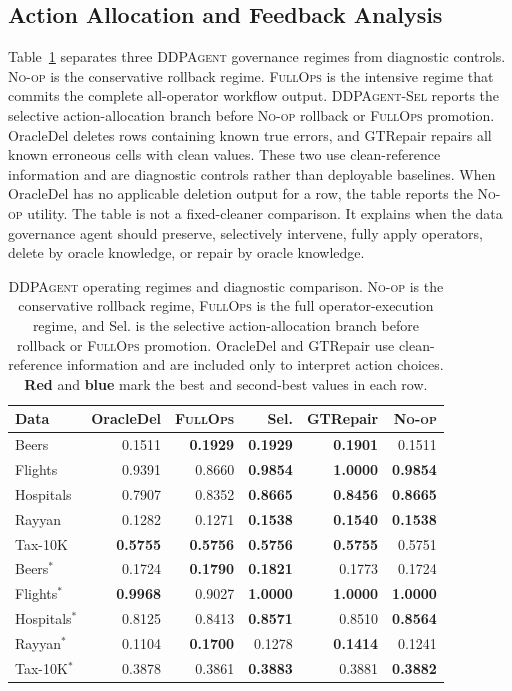 \documentclass[sigconf, nonacm]{acmart}
\newcommand{\sys}{\textsc{DDPAgent}\xspace}
\newcommand{\noop}{\textsc{No-op}\xspace}
\newcommand{\fullops}{\textsc{FullOps}\xspace}
\newcommand{\syssel}{\textsc{DDPAgent-Sel}\xspace}
\newcommand{\best}[1]{\textcolor{rankFirst}{\textbf{#1}}}
\newcommand{\runner}[1]{\textcolor{rankSecond}{\textbf{#1}}}
\begin{document}
\subsection{Action Allocation and Feedback Analysis}

Table~\ref{tab:ablation} separates three \sys governance regimes from diagnostic controls. \noop is the conservative rollback regime. \fullops is the intensive regime that commits the complete all-operator workflow output. \syssel reports the selective action-allocation branch before \noop rollback or \fullops promotion. OracleDel deletes rows containing known true errors, and GTRepair repairs all known erroneous cells with clean values. These two use clean-reference information and are diagnostic controls rather than deployable baselines. When OracleDel has no applicable deletion output for a row, the table reports the \noop utility. The table is not a fixed-cleaner comparison. It explains when the data governance agent should preserve, selectively intervene, fully apply operators, delete by oracle knowledge, or repair by oracle knowledge.

\begin{table}[t]
  \caption{\sys operating regimes and diagnostic comparison. \noop is the conservative rollback regime, \fullops is the full operator-execution regime, and Sel. is the selective action-allocation branch before rollback or \fullops promotion. OracleDel and GTRepair use clean-reference information and are included only to interpret action choices. \best{Red} and \runner{blue} mark the best and second-best values in each row.}
  \label{tab:ablation}
  \centering
  \small
  \begin{tabular}{@{}lrrrrr@{}}
    \toprule
    Data & OracleDel & \fullops & Sel. & GTRepair & \noop \\
    \midrule
    Beers & 0.1511 & \best{0.1929} & \best{0.1929} & \runner{0.1901} & 0.1511 \\
    Flights & 0.9391 & 0.8660 & \runner{0.9854} & \best{1.0000} & \runner{0.9854} \\
    Hospitals & 0.7907 & 0.8352 & \best{0.8665} & \runner{0.8456} & \best{0.8665} \\
    Rayyan & 0.1282 & 0.1271 & \runner{0.1538} & \best{0.1540} & \runner{0.1538} \\
    Tax-10K & \runner{0.5755} & \best{0.5756} & \best{0.5756} & \runner{0.5755} & 0.5751 \\
    Beers$^*$ & 0.1724 & \runner{0.1790} & \best{0.1821} & 0.1773 & 0.1724 \\
    Flights$^*$ & \runner{0.9968} & 0.9027 & \best{1.0000} & \best{1.0000} & \best{1.0000} \\
    Hospitals$^*$ & 0.8125 & 0.8413 & \best{0.8571} & 0.8510 & \runner{0.8564} \\
    Rayyan$^*$ & 0.1104 & \best{0.1700} & 0.1278 & \runner{0.1414} & 0.1241 \\
    Tax-10K$^*$ & 0.3878 & 0.3861 & \best{0.3883} & 0.3881 & \runner{0.3882} \\
    \bottomrule
  \end{tabular}
\end{table}
\end{document}
